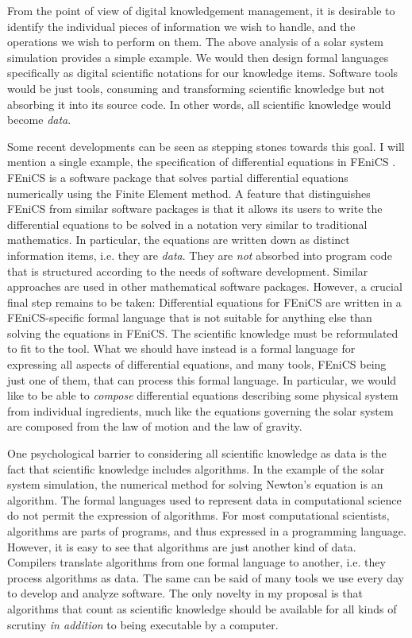 From the point of view of digital knowledgement management, it is desirable to identify the individual pieces of information we wish to handle, and the operations we wish to perform on them. The above analysis of a solar system simulation provides a simple example. We would then design formal languages specifically as digital scientific notations for our knowledge items. Software tools would be just tools, consuming and transforming scientific knowledge but not absorbing it into its source code. In other words, all scientific knowledge would become \textit{data}.

Some recent developments can be seen as stepping stones towards this goal. I will mention a single example, the specification of differential equations in FEniCS \cite{alnaes_fenics_2015}. FEniCS is a software package that solves partial differential equations numerically using the Finite Element method. A feature that distinguishes FEniCS from similar software packages is that it allows its users to write the differential equations to be solved in a notation very similar to traditional mathematics. In particular, the equations are written down as distinct information items, i.e. they are \textit{data}. They are \textit{not} absorbed into program code that is structured according to the needs of software development. Similar approaches are used in other mathematical software packages. However, a crucial final step remains to be taken: Differential equations for FEniCS are written in a FEniCS-specific formal language that is not suitable for anything else than solving the equations in FEniCS. The scientific knowledge must be reformulated to fit to the tool. What we should have instead is a formal language for expressing all aspects of differential equations, and many tools, FEniCS being just one of them, that can process this formal language. In particular, we would like to be able to \textit{compose} differential equations describing some physical system from individual ingredients, much like the equations governing the solar system are composed from the law of motion and the law of gravity.

One psychological barrier to considering all scientific knowledge as data is the fact that scientific knowledge includes algorithms. In the example of the solar system simulation, the numerical method for solving Newton's equation is an algorithm. The formal languages used to represent data in computational science do not permit the expression of algorithms. For most computational scientists, algorithms are parts of programs, and thus expressed in a programming language. However, it is easy to see that algorithms are just another kind of data. Compilers translate algorithms from one formal language to another, i.e. they process algorithms as data. The same can be said of many tools we use every day to develop and analyze software. The only novelty in my proposal is that algorithms that count as scientific knowledge should be available for all kinds of scrutiny \textit{in addition} to being executable by a computer.

